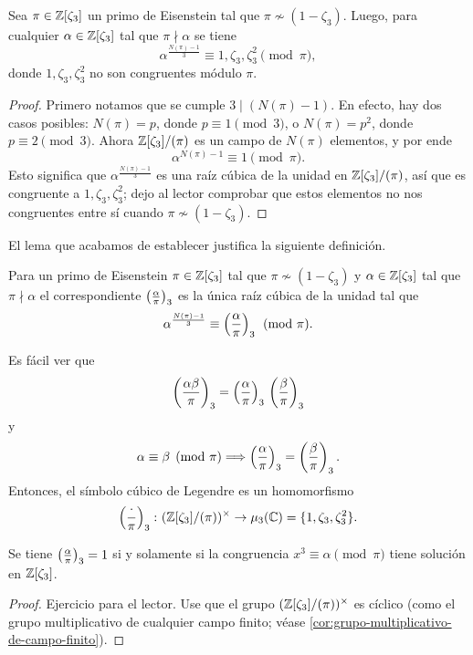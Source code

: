 \begin{lema}
  Sea $\pi \in \mathbb{Z} [\zeta_3]$ un primo de Eisenstein tal que
  $\pi\not\sim (1-\zeta_3)$. Luego, para cualquier $\alpha \in \mathbb{Z} [\zeta_3]$
  tal que $\pi\nmid\alpha$ se tiene
  $$\alpha^{\frac{N (\pi) - 1}{3}} \equiv 1, \zeta_3, \zeta_3^2 \pmod{\pi},$$
  donde $1,\zeta_3,\zeta_3^2$ no son congruentes módulo $\pi$.

  \begin{proof}
    Primero notamos que se cumple $3 \mid (N (\pi) - 1)$. En efecto, hay dos
    casos posibles: $N (\pi) = p$, donde $p\equiv 1 \pmod{3}$,
    o $N (\pi) = p^2$, donde $p \equiv 2 \pmod{3}$. Ahora $\mathbb{Z} [\zeta_3]/(\pi)$
    es un campo de $N (\pi)$ elementos, y por ende
    $$\alpha^{N (\pi) - 1} \equiv 1 \pmod{\pi}.$$
    Esto significa que $\alpha^{\frac{N (\pi) - 1}{3}}$ es una raíz cúbica de la
    unidad en $\mathbb{Z} [\zeta_3]/(\pi)$, así que es congruente a
    $1,\zeta_3,\zeta_3^2$; dejo al lector comprobar que estos
    elementos no nos congruentes entre sí cuando $\pi\not\sim (1-\zeta_3)$.
  \end{proof}
\end{lema}

El lema que acabamos de establecer justifica la siguiente definición.

\begin{definicion}
  Para un primo de Eisenstein $\pi \in \mathbb{Z} [\zeta_3]$ tal que
  $\pi\not\sim (1-\zeta_3)$ y $\alpha\in\mathbb{Z} [\zeta_3]$ tal que
  $\pi\nmid\alpha$ el  correspondiente
  $\left(\frac{\alpha}{\pi}\right)_3$ es la única raíz cúbica de la unidad tal que
  $$\alpha^{\frac{N (\pi) - 1}{3}} \equiv \left(\frac{\alpha}{\pi}\right)_3 \pmod{\pi}.$$
\end{definicion}

Es fácil ver que
\[ \left(\frac{\alpha\beta}{\pi}\right)_3
       = \left(\frac{\alpha}{\pi}\right)_3\,\left(\frac{\beta}{\pi}\right)_3 \]
y
\[ \alpha\equiv\beta\pmod{\pi} \Longrightarrow \left(\frac{\alpha}{\pi}\right)_3
       = \left(\frac{\beta}{\pi}\right)_3. \]
Entonces, el símbolo cúbico de Legendre es un homomorfismo
\[ \left(\frac{\cdot}{\pi}\right)_3\colon (\mathbb{Z} [\zeta_3]/(\pi))^\times
       \to \mu_3 (\mathbb{C}) = \{ 1,\zeta_3,\zeta_3^2 \}. \]

\begin{lema}
  Se tiene $\left(\frac{\alpha}{\pi}\right)_3 = 1$ si y solamente si la congruencia
  $x^3 \equiv \alpha \pmod{\pi}$ tiene solución en $\mathbb{Z} [\zeta_3]$.

  \begin{proof}
    Ejercicio para el lector. Use que el grupo $(\mathbb{Z} [\zeta_3]/(\pi))^\times$
    es cíclico (como el grupo multiplicativo de cualquier campo finito;
    véase \ref{cor:grupo-multiplicativo-de-campo-finito}).
  \end{proof}
\end{lema}


